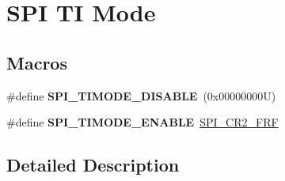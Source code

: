 \hypertarget{group___s_p_i___t_i__mode}{}\section{S\+PI TI Mode}
\label{group___s_p_i___t_i__mode}
\subsection*{Macros}
\begin{DoxyCompactItemize}
\item 
\mbox{\label{group___s_p_i___t_i__mode_gaffbf066ee656a4d56b75fa721a2eabcd}} 
\#define {\bfseries S\+P\+I\+\_\+\+T\+I\+M\+O\+D\+E\+\_\+\+D\+I\+S\+A\+B\+LE}~(0x00000000\+U)
\item 
\mbox{\label{group___s_p_i___t_i__mode_ga8b31d4b25f951edd1dfd7cf6d4387517}} 
\#define {\bfseries S\+P\+I\+\_\+\+T\+I\+M\+O\+D\+E\+\_\+\+E\+N\+A\+B\+LE}~\hyperlink{group___peripheral___registers___bits___definition_ga09e3f41fa2150831afaac191046087f2}{S\+P\+I\+\_\+\+C\+R2\+\_\+\+F\+RF}
\end{DoxyCompactItemize}


\subsection{Detailed Description}
